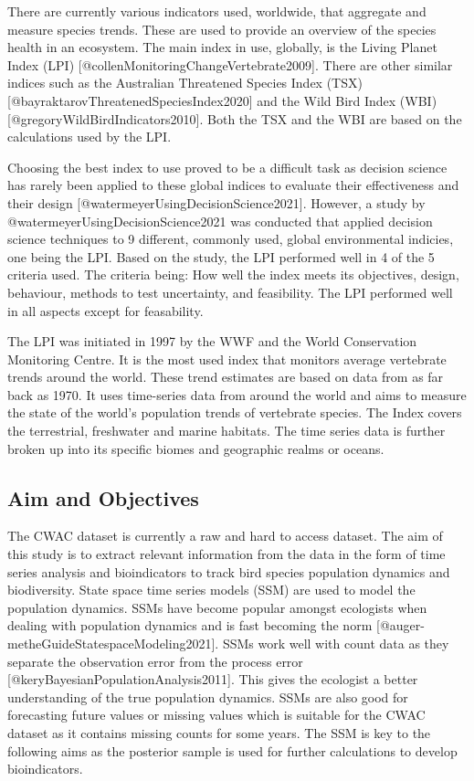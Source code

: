 \documentclass[
]{article}
\begin{document}
There are currently various indicators used, worldwide, that aggregate
and measure species trends. These are used to provide an overview of the
species health in an ecosystem. The main index in use, globally, is the
Living Planet Index (LPI) {[}@collenMonitoringChangeVertebrate2009{]}.
There are other similar indices such as the Australian Threatened
Species Index (TSX) {[}@bayraktarovThreatenedSpeciesIndex2020{]} and the
Wild Bird Index (WBI) {[}@gregoryWildBirdIndicators2010{]}. Both the TSX
and the WBI are based on the calculations used by the LPI.

Choosing the best index to use proved to be a difficult task as decision
science has rarely been applied to these global indices to evaluate
their effectiveness and their design
{[}@watermeyerUsingDecisionScience2021{]}. However, a study by
@watermeyerUsingDecisionScience2021 was conducted that applied decision
science techniques to 9 different, commonly used, global environmental
indicies, one being the LPI. Based on the study, the LPI performed well
in 4 of the 5 criteria used. The criteria being: How well the index
meets its objectives, design, behaviour, methods to test uncertainty,
and feasibility. The LPI performed well in all aspects except for
feasability.

The LPI was initiated in 1997 by the WWF and the World Conservation
Monitoring Centre. It is the most used index that monitors average
vertebrate trends around the world. These trend estimates are based on
data from as far back as 1970. It uses time-series data from around the
world and aims to measure the state of the world's population trends of
vertebrate species. The Index covers the terrestrial, freshwater and
marine habitats. The time series data is further broken up into its
specific biomes and geographic realms or oceans.

\hypertarget{aim-and-objectives}{%
\subsection{Aim and Objectives}\label{aim-and-objectives}}

The CWAC dataset is currently a raw and hard to access dataset. The aim
of this study is to extract relevant information from the data in the
form of time series analysis and bioindicators to track bird species
population dynamics and biodiversity. State space time series models
(SSM) are used to model the population dynamics. SSMs have become
popular amongst ecologists when dealing with population dynamics and is
fast becoming the norm {[}@auger-metheGuideStatespaceModeling2021{]}.
SSMs work well with count data as they separate the observation error
from the process error {[}@keryBayesianPopulationAnalysis2011{]}. This
gives the ecologist a better understanding of the true population
dynamics. SSMs are also good for forecasting future values or missing
values which is suitable for the CWAC dataset as it contains missing
counts for some years. The SSM is key to the following aims as the
posterior sample is used for further calculations to develop
bioindicators.
\end{document}

